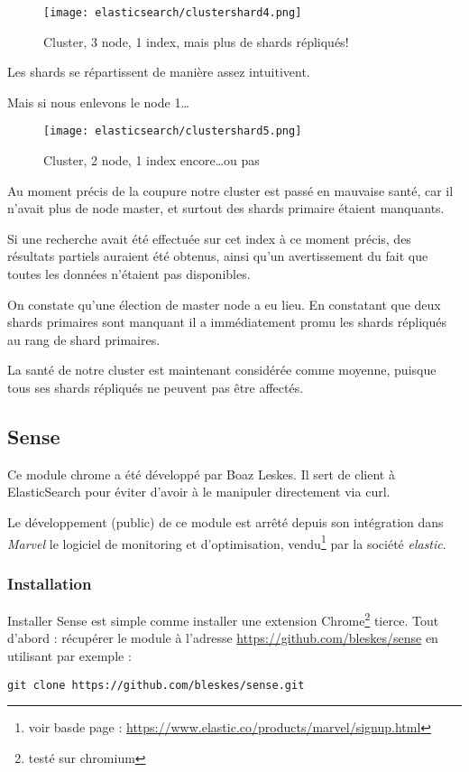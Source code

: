 \begin{figure}[H]
\center
\texttt{[image: elasticsearch/clustershard4.png]}
\label{fig:clustershard4}
\caption{Cluster, 3 node, 1 index, mais plus de shards répliqués!}
\end{figure}


Les shards se répartissent de manière assez intuitivent.

Mais si nous enlevons le node 1\ldots

\begin{figure}[H]
\center
\texttt{[image: elasticsearch/clustershard5.png]}
\label{fig:clustershard5}
\caption{Cluster, 2 node, 1 index encore\ldots ou pas}
\end{figure}

Au moment précis de la coupure notre cluster est passé en mauvaise santé, car il 
n'avait plus de node master, et surtout des shards primaire étaient manquants.

Si une recherche avait été effectuée sur cet index à ce moment précis, des résultats partiels
auraient été obtenus, ainsi qu'un avertissement du fait que toutes les données n'étaient
pas disponibles.

On constate qu'une élection de master node a eu lieu. En constatant que deux shards 
primaires sont manquant il a immédiatement promu les shards répliqués au rang de 
shard primaires.

La santé de notre cluster est maintenant considérée comme moyenne, puisque tous ses
shards répliqués ne peuvent pas être affectés.



\subsection{Sense}
\label{subsec:elasticsense}
Ce module chrome a été développé par Boaz Leskes. Il sert de client à ElasticSearch
pour éviter d'avoir à le manipuler directement via curl.

Le développement (public) de ce module est arrêté depuis son intégration dans \emph{Marvel} 
le logiciel de monitoring et d'optimisation, vendu\footnote{voir basde page : 
\url{https://www.elastic.co/products/marvel/signup.html}} par la société \emph{elastic}.


\subsubsection{Installation}
Installer Sense est simple comme installer une extension 
Chrome\footnote{testé sur chromium} tierce.
Tout d'abord : récupérer le module à l'adresse \url{https://github.com/bleskes/sense}
en utilisant par exemple : 
\begin{lstlisting}[style=code,label=lst:gitclonesense]
git clone https://github.com/bleskes/sense.git
\end{lstlisting}

